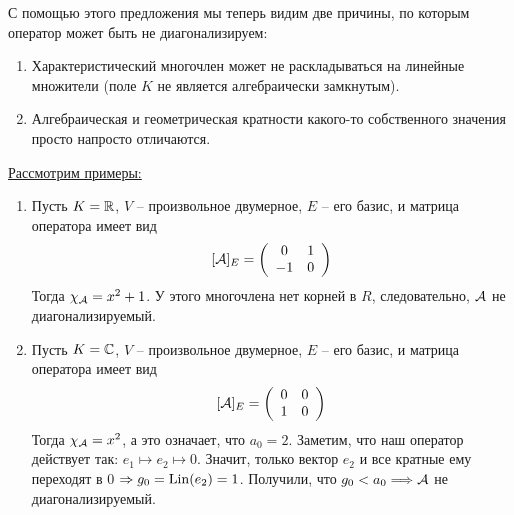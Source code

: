 С помощью этого предложения мы теперь видим две причины, по которым оператор может быть не диагонализируем:
\begin{enumerate}
    \item Характеристический многочлен может не раскладываться на линейные множители (поле $K$ не является алгебраически замкнутым).
    \item Алгебраическая и геометрическая кратности какого-то собственного значения просто напросто отличаются.
\end{enumerate}

\vspace*{4mm}

\underline{Рассмотрим примеры:}
\begin{enumerate}
    \item Пусть $ K = \mathbb{R}$, $V$ -- произвольное двумерное, $E$ -- его базис, и матрица оператора имеет вид \[ [\mathcal{A}]_{E} = \left(\begin{array}{cc}
    0 & 1 \\ 
    -1 & 0
    \end{array}\right) \] 
    Тогда $\chi_{\mathcal{A}} = x^2 + 1$. 
    У этого многочлена нет корней в $R$, следовательно, $\mathcal{A}$ не диагонализируемый.

    \item Пусть $K = \mathbb{C}$, $V$ -- произвольное двумерное, $E$ -- его базис, и матрица оператора имеет вид
    \[ [\mathcal{A}]_{E} = \left(\begin{array}{cc}
        0 & 0 \\ 
        1 & 0
    \end{array}\right)\] 
    Тогда $\chi_{\mathcal{A}} = x^2$, а это означает, что $a_0 = 2$.
    Заметим, что наш оператор действует так: $e_1 \mapsto e_2 \mapsto 0$.
    Значит, только вектор $e_2$ и все кратные ему переходят в 0 $\Rightarrow g_0 = \operatorname{Lin}(e_2) = 1$.
    Получили, что $g_0 < a_0 \Longrightarrow \mathcal{A}$ не диагонализируемый.
\end{enumerate}